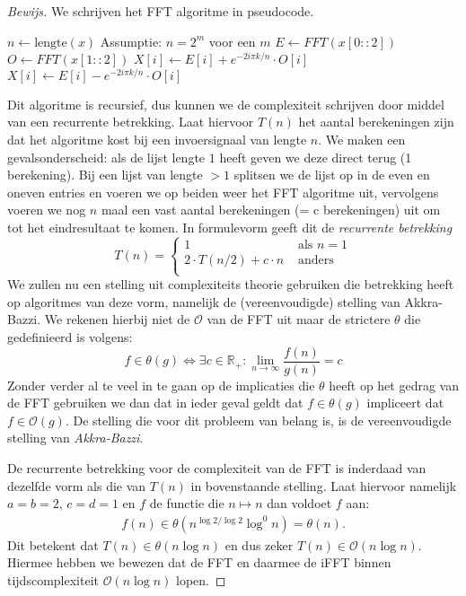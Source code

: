\documentclass[11pt]{report}
\newcommand{\R}{\mathbb{R}}
\renewcommand{\O}{\mathcal{O}}
\theoremstyle{remark}
\newcommand{\eq}[1]{\begin{eqnarray*} #1 \end{eqnarray*}}
\begin{document}
\begin{proof}[Bewijs]
We schrijven het FFT algoritme in pseudocode.

\begin{algorithmic}
\State $n \gets \text{lengte}(x)$ \Comment Assumptie: $n = 2^m$ voor een $m$
\Else
	\State $E \gets FFT(x[0::2])$ 
	\State $O \gets FFT(x[1::2])$ 
			\State $X[i] \gets E[i] + e^{-2i \pi k/n} \cdot O[i]$
		\Else
			\State $X[i] \gets E[i] - e^{-2i \pi k/n} \cdot O[i]$
		\EndIf
	\EndFor
\EndIf
\State {}
\EndFunction
\end{algorithmic}

Dit algoritme is recursief, dus kunnen we de complexiteit schrijven door middel van een recurrente betrekking. Laat hiervoor $T(n)$ het aantal berekeningen zijn dat het algoritme kost bij een invoersignaal van lengte $n$. We maken een gevalsonderscheid: als de lijst lengte $1$ heeft geven we deze direct terug (1 berekening). Bij een lijst van lengte $>1$ splitsen we de lijst op in de even en oneven entries en voeren we op beiden weer het FFT algoritme uit, vervolgens voeren we nog $n$ maal een vast aantal berekeningen (= c berekeningen) uit om tot het eindresultaat te komen. In formulevorm geeft dit de \emph{recurrente betrekking}
\[
T(n) = \begin{cases}
    1 &\text{ als } n = 1 \\
      2\cdot T(n/2) + c\cdot n &\text{ anders} \\
\end{cases}
\]
We zullen nu een stelling uit complexiteits theorie gebruiken die betrekking heeft op algoritmes van deze vorm, namelijk de (vereenvoudigde) stelling van Akkra-Bazzi. We rekenen hierbij niet de $\O$ van de FFT uit maar de strictere $\theta$ die gedefinieerd is volgens:
\[
f \in \theta(g) \Leftrightarrow \exists c \in \R_+: \lim_{n \to \infty} \frac{f(n)}{g(n)} = c
\]
Zonder verder al te veel in te gaan op de implicaties die $\theta$ heeft op het gedrag van de FFT gebruiken we dan dat in ieder geval geldt dat $f \in \theta(g)$ impliceert dat $f \in \O(g)$. 
De stelling die voor dit probleem van belang is, is de vereenvoudigde stelling van \emph{Akkra-Bazzi}.

De recurrente betrekking voor de complexiteit van de FFT is inderdaad van dezelfde vorm als die van $T(n)$ in bovenstaande stelling.
Laat hiervoor namelijk $a=b=2$, $c=d=1$ en $f$ de functie die $n\mapsto n$ dan voldoet $f$ aan:
\eq{
  f(n) \in \theta(n^{\log 2/\log 2} \log^0 n)=\theta(n).
}
Dit betekent dat $T(n) \in \theta(n \log n)$ en dus zeker $T(n) \in \O(n \log n)$.
Hiermee hebben we bewezen dat de FFT en daarmee de iFFT binnen tijdscomplexiteit $\O(n\log n)$ lopen. 
\end{proof}
\end{document}
